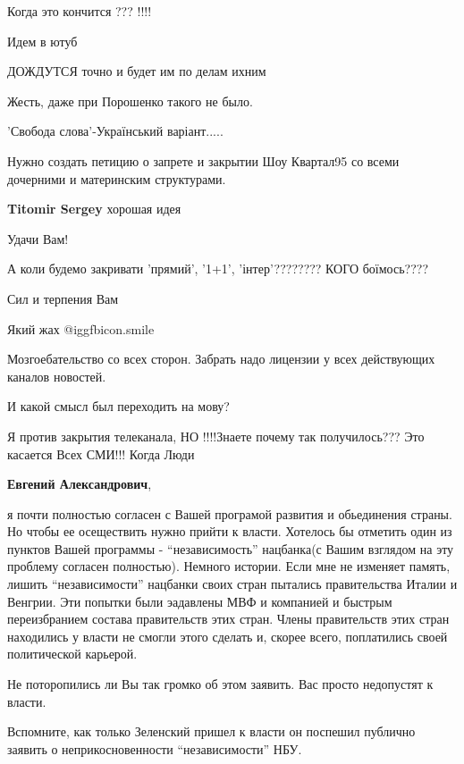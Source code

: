 \begin{itemize}
Когда это кончится ??? !!!!

Идем в ютуб

ДОЖДУТСЯ точно и будет им по делам ихним

Жесть, даже при Порошенко такого не было.

'Свобода слова'-Український варіант.....


Нужно создать петицию о запрете и закрытии Шоу Квартал95 со всеми дочерними и
материнским структурами.

\textbf{Titomir Sergey} хорошая идея

Удачи Вам!

А коли будемо закривати 'прямий', '1+1', 'інтер'???????? КОГО боїмось????

Сил и терпения Вам

Який жах  @igg{fbicon.smile} 

Мозгоебательство со всех сторон. Забрать надо лицензии у всех действующих каналов новостей.

И какой смысл был переходить на мову?


Я против закрытия телеканала, НО !!!!Знаете почему так получилось??? Это
касается Всех СМИ!!! Когда Люди

\textbf{Евгений Александрович}, 

я почти полностью согласен с Вашей програмой развития и обьединения страны. Но
чтобы ее осеществить нужно прийти к власти. Хотелось бы отметить один из
пунктов Вашей программы - \enquote{независимость} нацбанка(с Вашим взглядом на эту
проблему согласен полностью). Немного истории. Если мне не изменяет память,
лишить \enquote{независимости} нацбанки своих стран пытались правительства Италии и
Венгрии. Эти попытки были эадавлены МВФ и компанией и быстрым переизбранием
состава правительств этих стран. Члены правительств этих стран находились у
власти не смогли этого сделать и, скорее всего, поплатились своей политической
карьерой.

Не поторопились ли Вы так громко об этом заявить. Вас просто недопустят к власти.

Вспомните, как только Зеленский пришел к власти он поспешил публично заявить о
неприкосновенности \enquote{независимости} НБУ.


\end{itemize}
